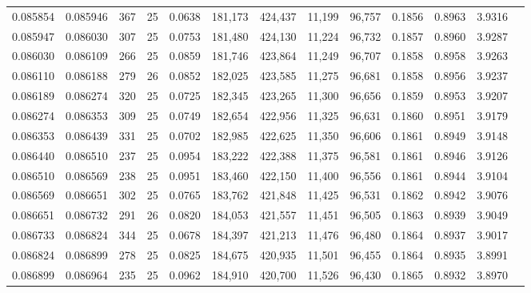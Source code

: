 \begin{tabular}{rrrrrrrrrrrrr}
0.085854 & 0.085946 &   367 &  25 &                                     0.0638 & 181,173 & 424,437 &  11,199 &  96,757 & 0.1856 & 0.8963 & 3.9316 \\
0.085947 & 0.086030 &   307 &  25 &                                     0.0753 & 181,480 & 424,130 &  11,224 &  96,732 & 0.1857 & 0.8960 & 3.9287 \\
0.086030 & 0.086109 &   266 &  25 &                                     0.0859 & 181,746 & 423,864 &  11,249 &  96,707 & 0.1858 & 0.8958 & 3.9263 \\
0.086110 & 0.086188 &   279 &  26 &                                     0.0852 & 182,025 & 423,585 &  11,275 &  96,681 & 0.1858 & 0.8956 & 3.9237 \\
0.086189 & 0.086274 &   320 &  25 &                                     0.0725 & 182,345 & 423,265 &  11,300 &  96,656 & 0.1859 & 0.8953 & 3.9207 \\
0.086274 & 0.086353 &   309 &  25 &                                     0.0749 & 182,654 & 422,956 &  11,325 &  96,631 & 0.1860 & 0.8951 & 3.9179 \\
0.086353 & 0.086439 &   331 &  25 &                                     0.0702 & 182,985 & 422,625 &  11,350 &  96,606 & 0.1861 & 0.8949 & 3.9148 \\
0.086440 & 0.086510 &   237 &  25 &                                     0.0954 & 183,222 & 422,388 &  11,375 &  96,581 & 0.1861 & 0.8946 & 3.9126 \\
0.086510 & 0.086569 &   238 &  25 &                                     0.0951 & 183,460 & 422,150 &  11,400 &  96,556 & 0.1861 & 0.8944 & 3.9104 \\
0.086569 & 0.086651 &   302 &  25 &                                     0.0765 & 183,762 & 421,848 &  11,425 &  96,531 & 0.1862 & 0.8942 & 3.9076 \\
0.086651 & 0.086732 &   291 &  26 &                                     0.0820 & 184,053 & 421,557 &  11,451 &  96,505 & 0.1863 & 0.8939 & 3.9049 \\
0.086733 & 0.086824 &   344 &  25 &                                     0.0678 & 184,397 & 421,213 &  11,476 &  96,480 & 0.1864 & 0.8937 & 3.9017 \\
0.086824 & 0.086899 &   278 &  25 &                                     0.0825 & 184,675 & 420,935 &  11,501 &  96,455 & 0.1864 & 0.8935 & 3.8991 \\
0.086899 & 0.086964 &   235 &  25 &                                     0.0962 & 184,910 & 420,700 &  11,526 &  96,430 & 0.1865 & 0.8932 & 3.8970 \\

\end{tabular}
